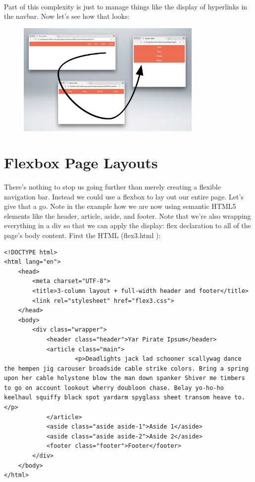 \paragraph{} Part of this complexity is just to manage things like the display of hyperlinks in the navbar. Now let's see how that looks:


\begin{figure}[H]
\centering
\includegraphics[width=0.8\textwidth]{figures/flexbox-navbar-example}
\label{fig:flexbox-navbar-example}
\caption{}
\end{figure}



\section{Flexbox Page Layouts}
\paragraph{} There's nothing to stop us going further than merely creating a flexible navigation bar. Instead we could use a flexbox to lay out our entire page. Let's give that a go. Note in the example how we are now using semantic HTML5 elements like the header, article, aside, and footer. Note that we're also wrapping everything in a div so that we can apply the display: flex declaration to all of the page's body content. First the HTML (flex3.html
):

\begin{lstlisting}
<!DOCTYPE html>
<html lang="en">
	<head>
		<meta charset="UTF-8">
  		<title>3-column layout + full-width header and footer</title>
  		<link rel="stylesheet" href="flex3.css">
	</head>
	<body>
		<div class="wrapper">
			<header class="header">Yar Pirate Ipsum</header>
  			<article class="main">
    				<p>Deadlights jack lad schooner scallywag dance the hempen jig carouser broadside cable strike colors. Bring a spring upon her cable holystone blow the man down spanker Shiver me timbers to go on account lookout wherry doubloon chase. Belay yo-ho-ho keelhaul squiffy black spot yardarm spyglass sheet transom heave to.</p>  
  			</article>
  			<aside class="aside aside-1">Aside 1</aside>
  			<aside class="aside aside-2">Aside 2</aside>
  			<footer class="footer">Footer</footer>
		</div>
	</body>
</html>
\end{lstlisting}

